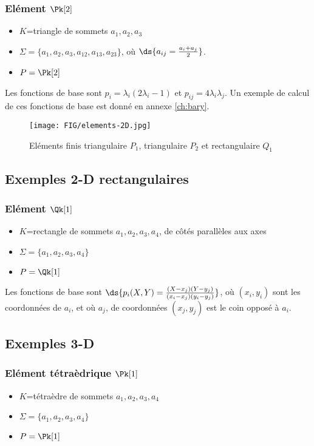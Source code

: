 \subsubsection{Elément $\Pk[2]$}
\begin{itemize}
\item $K$=triangle de sommets $a_1, a_2, a_3$
\item $\Sigma=\{a_1,a_2,a_3, a_{12}, a_{13}, a_{23}\}$,\/ o\`u $\ds{a_{ij}=\frac{a_i+a_j}{2}}$.
\item $P=\Pk[2]$
\end{itemize}
%
Les fonctions de base sont $p_i=\lambda_i (2\lambda_i -1)$ et
$p_{ij}=4\lambda_i\lambda_j$. Un exemple de calcul de ces fonctions de base
est donné en annexe \ref{ch:bary}.
%
\begin{figure}[h]
\begin{center}
\texttt{[image: FIG/elements-2D.jpg]}
\caption{Eléments finis triangulaire $P_1$, triangulaire $P_2$ et rectangulaire $Q_1$}
\end{center}
\end{figure}
%
%
\subsection{Exemples 2-D rectangulaires}
%
\subsubsection{Elément $\Qk[1]$}
\begin{itemize}
\item $K$=rectangle de sommets $a_1, a_2, a_3, a_4$, de c\^otés parallèles aux axes
\item $\Sigma=\{a_1,a_2,a_3,a_4\}$
\item $P=\Qk[1]$
\end{itemize}
%
Les fonctions de base sont
$\ds{p_i(X,Y)=\frac{(X-x_j)(Y-y_j)}{(x_i-x_j)(y_i-y_j)}}$, o\`u $(x_i,y_i)$
sont les coordonnées de $a_i$, et o\`u $a_j$, de coordonnées $(x_j,y_j)$
est le coin opposé à $a_i$.
%
\subsection{Exemples 3-D}
%
%
%
\subsubsection{Elément tétraèdrique $\Pk[1]$}
\begin{itemize}
\item $K$=tétraèdre de sommets $a_1, a_2, a_3, a_4$
\item $\Sigma=\{a_1,a_2,a_3, a_4\}$
\item $P=\Pk[1]$
\end{itemize}
%
%
